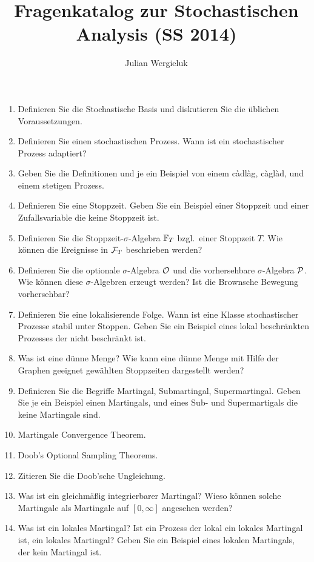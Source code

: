 \documentclass[11pt,oneside]{amsart}
\title{Fragenkatalog zur Stochastischen Analysis (SS 2014)}
\author{Julian Wergieluk}
\begin{document}
\maketitle

\begin{enumerate}
    \item Definieren Sie die Stochastische Basis und diskutieren Sie die
        üblichen Voraussetzungen.
    \item Definieren Sie einen stochastischen Prozess. Wann ist ein
        stochastischer Prozess adaptiert?
    \item Geben Sie die Definitionen und je ein Beispiel von einem c\`adl\`ag,
        c\`agl\`ad, und einem stetigen Prozess.
    \item Definieren Sie eine Stoppzeit. Geben Sie ein Beispiel einer Stoppzeit
        und einer Zufallsvariable die keine Stoppzeit ist.
    \item Definieren Sie die Stoppzeit-$\sigma$-Algebra $\mathbb F_{T}$ bzgl.\ einer 
        Stoppzeit $T$. Wie können die Ereignisse in $\mathcal F_{T}$ beschrieben werden?
    \item Definieren Sie die optionale $\sigma$-Algebra $\mathcal O$ und die
        vorhersehbare $\sigma$-Algebra $\mathcal P$. Wie können diese
        $\sigma$-Algebren erzeugt werden? Ist die Brownsche Bewegung
        vorhersehbar?
    \item Definieren Sie eine lokalisierende Folge. Wann ist eine Klasse stochastischer
        Prozesse stabil unter Stoppen. Geben Sie ein Beispiel eines lokal
        beschränkten Prozesses der nicht beschränkt ist. 
    \item Was ist eine dünne Menge? Wie kann eine dünne Menge mit Hilfe der
        Graphen geeignet gewählten Stoppzeiten dargestellt werden?

    \item Definieren Sie die Begriffe Martingal, Submartingal, Supermartingal.
        Geben Sie je ein Beispiel einen Martingals, und eines Sub- und
        Supermartigals die keine Martingale sind.

    \item Martingale Convergence Theorem.
    \item Doob's Optional Sampling Theorems.
    \item Zitieren Sie die Doob'sche Ungleichung.

    \item Was ist ein gleichmäßig integrierbarer Martingal? Wieso können solche
        Martingale als Martingale auf $[0,\infty]$ angesehen werden?
    \item Was ist ein lokales Martingal? Ist ein Prozess der lokal ein lokales
        Martingal ist, ein lokales Martingal? Geben Sie ein Beispiel eines
        lokalen Martingals, der kein Martingal ist.


\end{enumerate}
\end{document}
